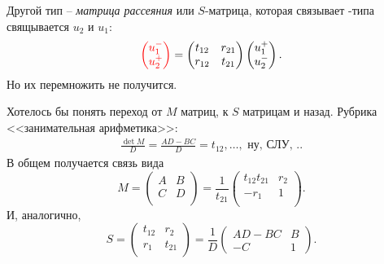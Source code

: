 Другой тип -- \textit{матрица рассеяния} или $S$-матрица, которая связывает
-типа свящывается $u_2$ и $u_1$:
\begin{equation*}
    \textcolor{red}{\begin{pmatrix}
        u_1^- \\ u_2^+
    \end{pmatrix}} = 
    \begin{pmatrix}
        t_{12} & r_{21} \\
        r_{12} & t_{21} \\
    \end{pmatrix}
    \begin{pmatrix}
        u_1^+ \\ u_2^-
    \end{pmatrix}.
\end{equation*}
Но их перемножить не получится. 

Хотелось бы понять переход от $M$ матриц, к $S$ матрицам и назад. Рубрика <<занимательная арифметика>>:
\begin{align*}
    \frac{\det M}{D}  = \frac{AD-BC}{D} = t_{12}, \ldots, \text{\ \ ну, СЛУ, ..}
\end{align*}
В общем получается связь вида
\begin{equation}
    M = \begin{pmatrix}
        A & B \\
        C & D \\
    \end{pmatrix} = 
    \frac{1}{t_{21}} \begin{pmatrix}
        t_{12} t_{21} & r_2 \\
        -r_1 & 1 \\ 
    \end{pmatrix}.
\end{equation}
И, аналогично,
\begin{equation}
    S = \begin{pmatrix}
        t_{12} & r_2 \\
        r_1 & t_{21} \\
    \end{pmatrix} = 
    \frac{1}{D} \begin{pmatrix}
        AD-BC & B  \\
        -C & 1
    \end{pmatrix}.
\end{equation}



